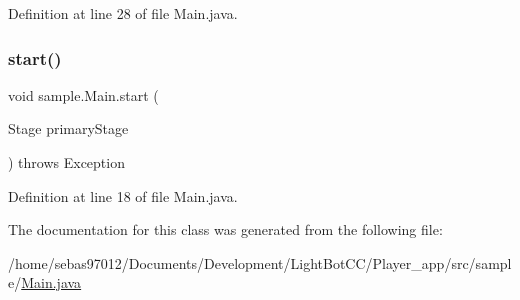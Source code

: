 Definition at line 28 of file Main.\+java.

\mbox{\label{classsample_1_1_main_a64ba37c898ca967654307543954cd09d}} 
\subsubsection{\texorpdfstring{start()}{start()}}
{\footnotesize\ttfamily void sample.\+Main.\+start (\begin{DoxyParamCaption}\item[{Stage}]{primary\+Stage }\end{DoxyParamCaption}) throws Exception\hspace{0.3cm}{\ttfamily [inline]}}



Definition at line 18 of file Main.\+java.



The documentation for this class was generated from the following file\+:\begin{DoxyCompactItemize}
\item 
/home/sebas97012/\+Documents/\+Development/\+Light\+Bot\+C\+C/\+Player\+\_\+app/src/sample/\mbox{\hyperlink{_player__app_2src_2sample_2_main_8java}{Main.\+java}}\end{DoxyCompactItemize}
